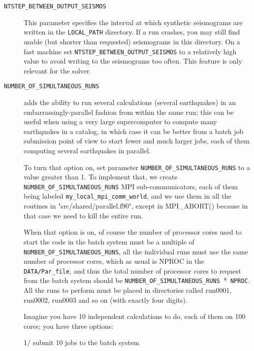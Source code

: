 \vspace{1cm}
\begin{description}
\item [{\texttt{NTSTEP\_BETWEEN\_OUTPUT\_SEISMOS}}] This parameter specifies
the interval at which synthetic seismograms are written in the \texttt{LOCAL\_PATH}
directory. If a run crashes, you may still find usable (but shorter
than requested) seismograms in this directory. On a fast machine set
\texttt{NTSTEP\_BETWEEN\_OUTPUT\_SEISMOS} to a relatively high value
to avoid writing to the seismograms too often. This feature is only
relevant for the solver.

\item [{\texttt{NUMBER\_OF\_SIMULTANEOUS\_RUNS}}] adds the ability to run several calculations (several earthquakes)
in an embarrassingly-parallel fashion from within the same run;
this can be useful when using a very large supercomputer to compute
many earthquakes in a catalog, in which case it can be better from
a batch job submission point of view to start fewer and much larger jobs,
each of them computing several earthquakes in parallel.

To turn that option on, set parameter \texttt{NUMBER\_OF\_SIMULTANEOUS\_RUNS} to a value greater than 1.
To implement that, we create \texttt{NUMBER\_OF\_SIMULTANEOUS\_RUNS} MPI sub-communicators,
each of them being labeled \texttt{my\_local\_mpi\_comm\_world}, and we use them
in all the routines in "src/shared/parallel.f90", except in MPI\_ABORT() because in that case
we need to kill the entire run.

When that option is on, of course the number of processor cores used to start
the code in the batch system must be a multiple of \texttt{NUMBER\_OF\_SIMULTANEOUS\_RUNS},
all the individual runs must use the same number of processor cores,
which as usual is NPROC in the \texttt{DATA/Par\_file},
and thus the total number of processor cores to request from the batch system
should be \texttt{NUMBER\_OF\_SIMULTANEOUS\_RUNS}~*~\texttt{NPROC}.
All the runs to perform must be placed in directories called run0001, run0002, run0003 and so on
(with exactly four digits).\newline

Imagine you have 10 independent calculations to do, each of them on 100 cores; you have three options:\newline

1/ submit 10 jobs to the batch system\newline


\end{description}
